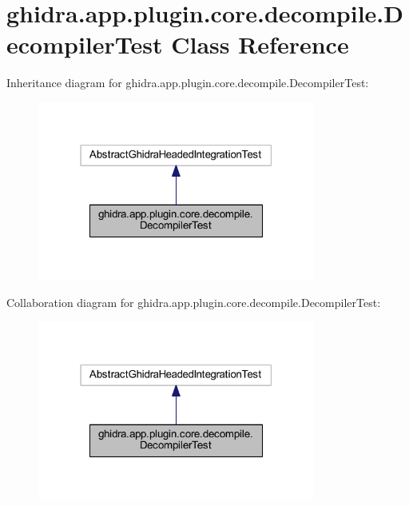 \hypertarget{classghidra_1_1app_1_1plugin_1_1core_1_1decompile_1_1_decompiler_test}{}\section{ghidra.\+app.\+plugin.\+core.\+decompile.\+Decompiler\+Test Class Reference}
\label{classghidra_1_1app_1_1plugin_1_1core_1_1decompile_1_1_decompiler_test}


Inheritance diagram for ghidra.\+app.\+plugin.\+core.\+decompile.\+Decompiler\+Test\+:
\nopagebreak
\begin{figure}[H]
\begin{center}
\leavevmode
\includegraphics[width=259pt]{classghidra_1_1app_1_1plugin_1_1core_1_1decompile_1_1_decompiler_test__inherit__graph}
\end{center}
\end{figure}


Collaboration diagram for ghidra.\+app.\+plugin.\+core.\+decompile.\+Decompiler\+Test\+:
\nopagebreak
\begin{figure}[H]
\begin{center}
\leavevmode
\includegraphics[width=259pt]{classghidra_1_1app_1_1plugin_1_1core_1_1decompile_1_1_decompiler_test__coll__graph}
\end{center}
\end{figure}
